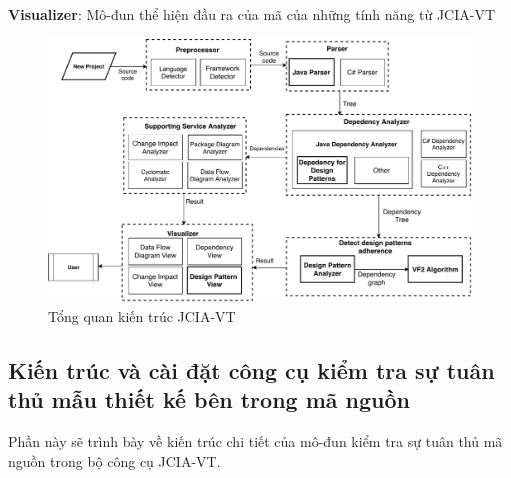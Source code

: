 \documentclass[12pt]{report}
\begin{document}
\noindent \textbf{Visualizer}: Mô-đun thể hiện đầu ra của mã của những tính năng từ JCIA-VT
\begin{figure}[h]
	\centering
	\includegraphics[scale=0.7]{images/jcia_architexture}
	\caption{Tổng quan kiến trúc JCIA-VT}
	\label{fig:architexture}
\end{figure}
\subsection{Kiến trúc và cài đặt công cụ kiểm tra sự tuân thủ mẫu thiết kế bên trong mã nguồn}
Phần này sẽ trình bày về kiến trúc chi tiết của mô-đun kiểm tra sự tuân thủ mã nguồn trong bộ công cụ JCIA-VT.
\end{document}
